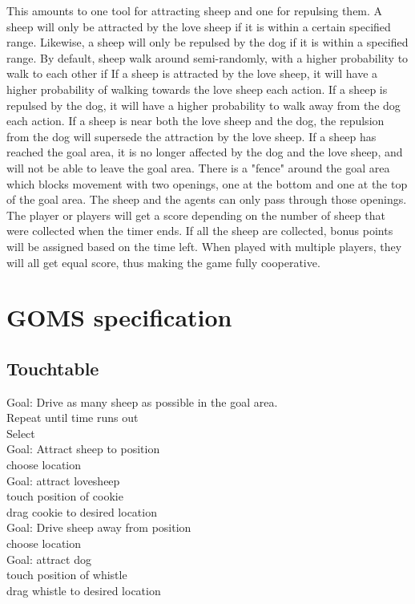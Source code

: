 \documentclass[a4paper,10pt]{report}
\newcommand{\tab}{\hspace*{1em}}
\begin{document}
This amounts to one tool for attracting sheep and one for repulsing them. 
A sheep will only be attracted by the love sheep if it is within a certain specified range.
Likewise, a sheep will only be repulsed by the dog if it is within a specified range.
By default, sheep walk around semi-randomly, with a higher probability to walk to each other if 
If a sheep is attracted by the love sheep, it will have a higher probability of walking towards the love sheep each action.
If a sheep is repulsed by the dog, it will have a higher probability to walk away from the dog each action.
If a sheep is near both the love sheep and the dog, the repulsion from the dog will supersede the attraction by the love sheep.
If a sheep has reached the goal area, it is no longer affected by the dog and the love sheep, and will not be able to leave the goal area.
There is a "fence" around the goal area which blocks movement with two openings, one at the bottom and one at the top of the goal area.
The sheep and the agents can only pass through those openings. 
The player or players will get a score depending on the number of sheep that were collected when the timer ends.
If all the sheep are collected, bonus points will be assigned based on the time left.
When played with multiple players, they will all get equal score, thus making the game fully cooperative.

\section{GOMS specification}

\subsection{Touchtable}
Goal: Drive as many sheep as possible in the goal area.
\\
\tab Repeat until time runs out \\
\tab \tab Select \\
\tab  \tab \tab Goal: Attract sheep to position\\
\tab \tab \tab \tab choose location \\
\tab \tab \tab \tab Goal: attract lovesheep \\
\tab \tab \tab \tab \tab touch position of cookie \\
\tab \tab \tab \tab \tab drag cookie to desired location \\
\tab \tab \tab Goal: Drive sheep away from position\\
\tab \tab \tab \tab choose location \\
\tab \tab \tab \tab Goal: attract dog \\
\tab \tab \tab \tab \tab touch position of whistle \\
\tab \tab \tab \tab \tab drag whistle to desired location\\
\end{document}
